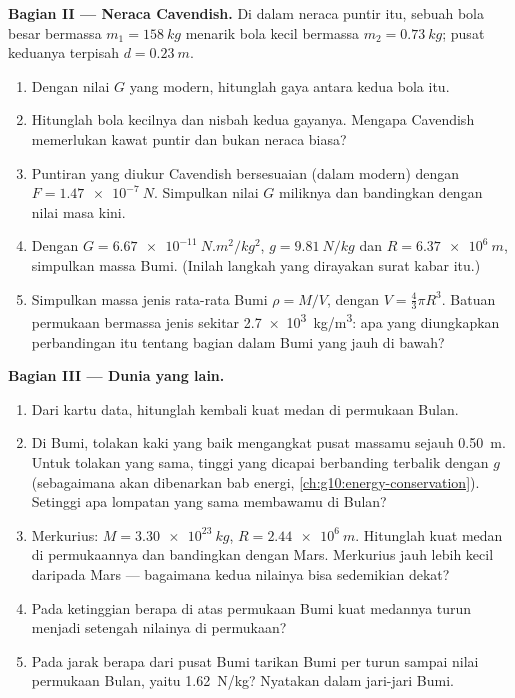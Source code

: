 \begin{problem}
\medskip
\noindent\textbf{Bagian II --- Neraca Cavendish.}
Di dalam neraca puntir itu, sebuah bola besar bermassa
$m_1 = \qty{158}{kg}$ menarik bola kecil bermassa
$m_2 = \qty{0.73}{kg}$; pusat keduanya terpisah $d = \qty{0.23}{m}$.
\begin{enumerate}[resume]
  \item Dengan nilai $G$ yang modern, hitunglah gaya antara kedua bola
        itu.
  \item Hitunglah  bola kecilnya dan nisbah kedua gayanya. Mengapa
        Cavendish memerlukan kawat puntir dan bukan neraca biasa?
  \item Puntiran yang diukur Cavendish bersesuaian (dalam 
        modern) dengan $F = \qty{1.47e-7}{N}$. Simpulkan nilai $G$
        miliknya dan bandingkan dengan nilai masa kini.
  \item Dengan $G = \qty{6.67e-11}{N.m^2/kg^2}$, $g = \qty{9.81}{N/kg}$
        dan $R = \qty{6.37e6}{m}$, simpulkan massa Bumi. (Inilah
        langkah yang dirayakan surat kabar itu.)
  \item Simpulkan massa jenis rata-rata Bumi $\rho = M / V$, dengan
        $V = \frac43 \pi R^3$. Batuan permukaan bermassa jenis sekitar
        \qty{2.7e3}{kg/m^3}: apa yang diungkapkan perbandingan itu
        tentang bagian dalam Bumi yang jauh di bawah?
\end{enumerate}

\medskip
\noindent\textbf{Bagian III --- Dunia yang lain.}
\begin{enumerate}[resume]
  \item Dari kartu data, hitunglah kembali kuat medan di permukaan
        Bulan.
  \item Di Bumi, tolakan kaki yang baik mengangkat pusat massamu
        sejauh \qty{0.50}{m}. Untuk tolakan yang sama, tinggi yang
        dicapai berbanding terbalik dengan $g$ (sebagaimana akan
        dibenarkan bab energi, \cref{ch:g10:energy-conservation}).
        Setinggi apa lompatan yang sama membawamu di Bulan?
  \item Merkurius: $M = \qty{3.30e23}{kg}$, $R = \qty{2.44e6}{m}$.
        Hitunglah kuat medan di permukaannya dan bandingkan dengan
        Mars. Merkurius jauh lebih kecil daripada Mars --- bagaimana
        kedua nilainya bisa sedemikian dekat?
  \item Pada ketinggian berapa di atas permukaan Bumi kuat medannya
        turun menjadi setengah nilainya di permukaan?
  \item Pada jarak berapa dari pusat Bumi tarikan Bumi per 
        turun sampai nilai permukaan Bulan, yaitu \qty{1.62}{N/kg}?
        Nyatakan dalam jari-jari Bumi.
\end{enumerate}


\end{problem}
